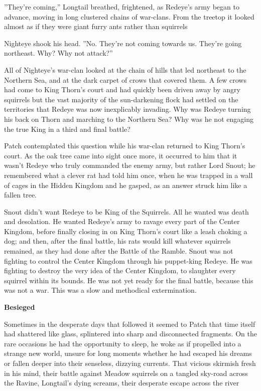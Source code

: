 \documentclass[11pt]{article}
\begin{document}
 ''They're coming,'' Longtail breathed, frightened, as Redeye's army began to advance, moving in long clustered chains of war-clans. From the treetop it looked almost as if they were giant furry ants rather than squirrels\par
 Nighteye shook his head. ''No. They're not coming towards us. They're going northeast. Why? Why not attack?''\par
 All of Nighteye's war-clan looked at the chain of hills that led northeast to the Northern Sea, and at the dark carpet of crows that covered them. A few crows had come to King Thorn's court %
 and had quickly been driven away by angry squirrels %
 but the vast majority of the sun-darkening flock had settled on the territories that Redeye was now inexplicably invading. Why was Redeye turning his back on Thorn and marching to the Northern Sea? Why was he not engaging the true King in a third and final battle?\par
 Patch contemplated this question while his war-clan returned to King Thorn's court. As the oak tree came into sight once more, it occurred to him that it wasn't Redeye who truly commanded the enemy army, but rather Lord Snout; he remembered what a clever rat had told him once, when he was trapped in a wall of cages in the Hidden Kingdom %
 and he gasped, as an answer struck him like a fallen tree.\par
 Snout didn't want Redeye to be King of the Squirrels. All he wanted was death and desolation. He wanted Redeye's army to ravage every part of the Center Kingdom, before finally closing in on King Thorn's court like a leash choking a dog; and then, after the final battle, his rats would kill whatever squirrels remained, as they had done after the Battle of the Ramble. Snout was not fighting to control the Center Kingdom through his puppet-king Redeye. He was fighting to destroy the very idea of the Center Kingdom, to slaughter every squirrel within its bounds. He was not yet ready for the final battle, because this was not a war. This was a slow and methodical extermination.\par
\par
{\bf Besieged\par
}\par
 Sometimes in the desperate days that followed it seemed to Patch that time itself had shattered like glass, splintered into sharp and disconnected fragments. On the rare occasions he had the opportunity to sleep, he woke as if propelled into a strange new world, unsure for long moments whether he had escaped his dreams or fallen deeper into their senseless, dizzying currents. That vicious skirmish fresh in his mind, their battle against Meadow squirrels on a tangled sky-road across the Ravine, Longtail's dying screams, their desperate escape across the river %
\end{document}
